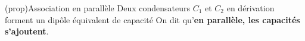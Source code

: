\documentclass[../../main/main.tex]{subfiles}
\begin{document}
\begin{tcbraster}[raster columns=2, raster equal height=rows]
	\begin{tcb}[label=prop:cpara](prop){Association en parallèle}
		Deux condensateurs $C_1$ et $C_2$ en dérivation forment un dipôle
		équivalent de capacité
		\psw{
			\[
				\boxed{C_{\rm eq} = C_1 + C_2}
			\]
		}
		On dit qu'\textbf{en parallèle, les capacités s'ajoutent}.
		\tcblower
		\begin{center}
\end{center}
\end{tcb}
\end{tcbraster}
\end{document}
